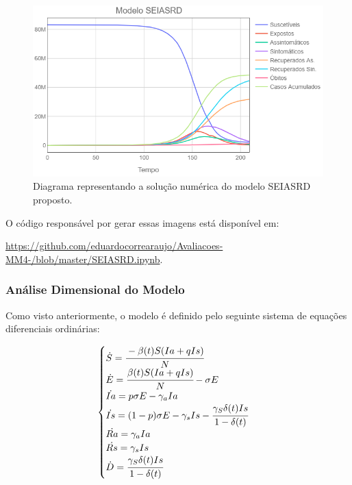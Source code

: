 \documentclass[12pt]{article}
\begin{document}
\begin{figure}[h]
\begin{center}
    \includegraphics[scale = 0.6]{SEIASRD.png}
    \caption{Diagrama representando a solução numérica do  modelo SEIASRD proposto.}
\end{center}
\end{figure}



\noindent O código responsável por gerar essas imagens está disponível em: 

\noindent \url{https://github.com/eduardocorrearaujo/Avaliacoes-MM4-/blob/master/SEIASRD.ipynb}.

 
\newpage
\subsubsection{Análise Dimensional do Modelo}
Como visto anteriormente, o modelo é definido pelo seguinte sistema de equações diferenciais ordinárias:
\begin{center}
$$
\begin{cases}
\dot S = \cfrac{-\beta(t)S(Ia + qIs)}{N} \\
\dot E = \cfrac{\beta(t)S(Ia + qIs)}{N} - \sigma E \\
\dot {Ia} = p\sigma E - \gamma_aIa\\
\dot {Is} = (1-p)\sigma E - \gamma_sIs - \cfrac{\gamma_S \delta (t)Is}{1 - \delta(t)}\\
\dot {Ra} = \gamma_aIa\\
\dot {Rs} = \gamma_sIs\\
\dot {D} = \cfrac{\gamma_S \delta (t)Is}{1 - \delta(t)}

\end{cases}
$$
\end{center}
\end{document}
